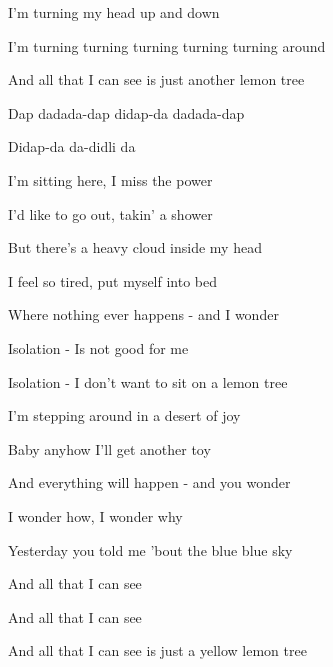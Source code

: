 \begin{song}
\begin{chorusbox}{\Chorus}
\bigskip

I'm turning my head up and down \par
I'm turning turning turning turning turning around \par
And all that I can see is just another lemon tree  \par
\end{chorusbox}

\bigskip

Dap  dadada-dap didap-da dadada-dap \par
{}Didap-da  da-didli da   \par

\bigskip

I'm sitting here, I miss the power \par
I'd like to go out, takin' a shower \par
But there's a heavy cloud inside my head \par
I feel so tired, put myself into bed \par
Where nothing ever happens -  and I wonder   \par

\bigskip

 Isolation - Is not good for me \par
{} Isolation - I don't want to  sit on a lemon tree \par

\bigskip

I'm stepping around in a desert of joy \par
{}Baby anyhow I'll get another toy \par
And everything will happen -  and you wonder   \par

\bigskip

\Chorus

\bigskip

I wonder how, I wonder why \par
{}Yesterday you told me 'bout the blue blue sky \par
And all that I can see \par
And all that I can see \par
And all that I can see is just a yellow lemon tree \par

\end{song}
